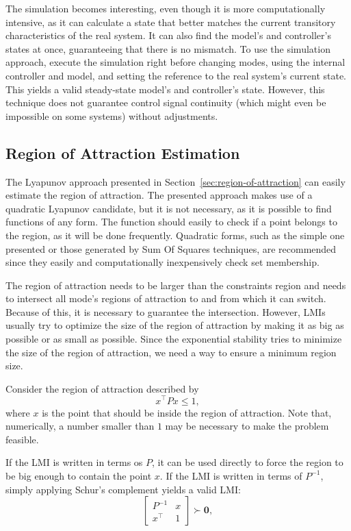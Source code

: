 The simulation becomes interesting, even though it is more computationally
intensive, as it can calculate a state that better matches the current
transitory characteristics of the real system. It can also find the model's and
controller's states at once, guaranteeing that there is no mismatch. To use the
simulation approach, execute the simulation right before changing modes, using
the internal controller and model, and setting the reference to the real
system's current state. This yields a valid steady-state model's and
controller's state. However, this technique does not guarantee control signal
continuity (which might even be impossible on some systems) without adjustments.

\subsection{Region of Attraction Estimation}%
\label{subsec:roa-estimation}

The Lyapunov approach presented in Section~\ref{sec:region-of-attraction} can
easily estimate the region of attraction. The presented approach makes use of a
quadratic Lyapunov candidate, but it is not necessary, as it is possible to find
functions of any form. The function should easily to check if a point belongs to
the region, as it will be done frequently. Quadratic forms, such as the simple
one presented or those generated by Sum Of Squares techniques, are recommended
since they easily and computationally inexpensively check set membership.

The region of attraction needs to be larger than the constraints region and
needs to intersect all mode's regions of attraction to and from which it can
switch. Because of this, it is necessary to guarantee the intersection. However,
LMIs usually try to optimize the size of the region of attraction by making it
as big as possible or as small as possible. Since the exponential stability
tries to minimize the size of the region of attraction, we need a way to ensure
a minimum region size.

Consider the region of attraction described by
%
\begin{equation}
  x^{\top}Px \le{} 1,
\end{equation}
%
where \(x\) is the point that should be inside the region of attraction. Note
that, numerically, a number smaller than \(1\) may be necessary to make the
problem feasible.

If the LMI is written in terms os \(P\), it can be used directly to force the
region to be big enough to contain the point \(x\). If the LMI is written in
terms of \(P^{-1}\), simply applying Schur's complement yields a valid LMI:
%
\begin{equation}
  \label{eq:lmi-point-inside-roa}
  \begin{bmatrix}
    P^{-1}   & x \\
    x^{\top} & 1
  \end{bmatrix} \succ \mathbf{0},
\end{equation}

